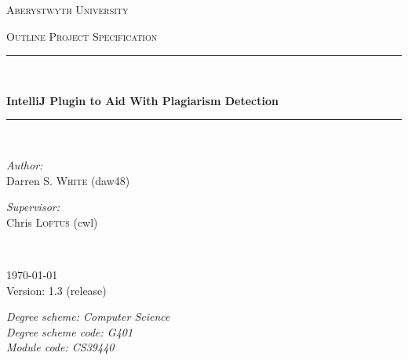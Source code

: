 \documentclass{article}
\begin{document}
\begin{titlepage}
  \begin{center}
    \vspace*{.06\textheight}
    {\scshape\LARGE Aberystwyth University\par}\vspace{1.5cm}
    \textsc{\Large Outline Project Specification}\\[0.5cm]

    \rule{.9\linewidth}{.6pt} \\[0.4cm]
    {\huge \bfseries IntelliJ Plugin to Aid With Plagiarism Detection\par}\vspace{0.4cm}
    \rule{.9\linewidth}{.6pt} \\[1.5cm]

    \begin{minipage}[t]{0.4\textwidth}
    \begin{flushleft} \large
    \emph{Author:}\\
    Darren S. \textsc{White} (daw48)
    \end{flushleft}
    \end{minipage}
    \begin{minipage}[t]{0.4\textwidth}
    \begin{flushright} \large
    \emph{Supervisor:} \\
    Chris \textsc{Loftus} (cwl)
    \end{flushright}
    \end{minipage}\\[3cm]

    \vfill

    \large \today\\[0.3cm]
    Version: 1.3 (release)\\[4cm]
    
    \vfill

    \large \textit{Degree scheme: Computer Science}\\[0.3cm]
    \textit{Degree scheme code: G401}\\[0.4cm]
    \textit{Module code: CS39440}\\[2cm]

    \vfill
  \end{center}
\end{titlepage}

\pagebreak





\pagebreak

\nocite{*}
\printbibliography
\end{document}

